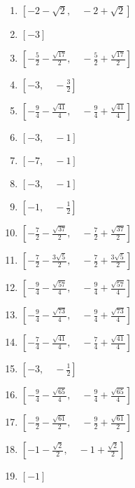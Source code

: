 \documentclass[9pt,dvipdfmx,a4paper]{article}
\begin{document}
\begin{multicols}{2}
\begin{enumerate}
\item
$ \left [ -2 - \sqrt{2}, \quad -2 + \sqrt{2}\right ]$

\item
$ \left [ -3\right ]$

\item
$ \left [ - \frac{5}{2} - \frac{\sqrt{17}}{2}, \quad - \frac{5}{2} + \frac{\sqrt{17}}{2}\right ]$

\item
$ \left [ -3, \quad - \frac{3}{2}\right ]$

\item
$ \left [ - \frac{9}{4} - \frac{\sqrt{41}}{4}, \quad - \frac{9}{4} + \frac{\sqrt{41}}{4}\right ]$

\item
$ \left [ -3, \quad -1\right ]$

\item
$ \left [ -7, \quad -1\right ]$

\item
$ \left [ -3, \quad -1\right ]$

\item
$ \left [ -1, \quad - \frac{1}{2}\right ]$

\item
$ \left [ - \frac{7}{2} - \frac{\sqrt{37}}{2}, \quad - \frac{7}{2} + \frac{\sqrt{37}}{2}\right ]$

\item
$ \left [ - \frac{7}{2} - \frac{3 \sqrt{5}}{2}, \quad - \frac{7}{2} + \frac{3 \sqrt{5}}{2}\right ]$

\item
$ \left [ - \frac{9}{4} - \frac{\sqrt{57}}{4}, \quad - \frac{9}{4} + \frac{\sqrt{57}}{4}\right ]$

\item
$ \left [ - \frac{9}{4} - \frac{\sqrt{73}}{4}, \quad - \frac{9}{4} + \frac{\sqrt{73}}{4}\right ]$

\item
$ \left [ - \frac{7}{4} - \frac{\sqrt{41}}{4}, \quad - \frac{7}{4} + \frac{\sqrt{41}}{4}\right ]$

\item
$ \left [ -3, \quad - \frac{1}{2}\right ]$

\item
$ \left [ - \frac{9}{4} - \frac{\sqrt{65}}{4}, \quad - \frac{9}{4} + \frac{\sqrt{65}}{4}\right ]$

\item
$ \left [ - \frac{9}{2} - \frac{\sqrt{61}}{2}, \quad - \frac{9}{2} + \frac{\sqrt{61}}{2}\right ]$

\item
$ \left [ -1 - \frac{\sqrt{2}}{2}, \quad -1 + \frac{\sqrt{2}}{2}\right ]$

\item
$ \left [ -1\right ]$


\end{enumerate}
\end{multicols}
\end{document}

